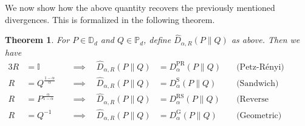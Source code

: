 \documentclass[12pt]{article}
\newtheorem{theorem}{Theorem}[section] %
\theoremstyle{definition}
\begin{document}
We now show how the above quantity recovers the previously mentioned divergences. This is formalized in the following theorem.
\begin{theorembox}
 \begin{theorem}
    For $P \in \mathbb D_d$ and $Q \in \mathbb P_d$, define $\hat{D}_{\alpha, R}(P \| Q)$ as above. Then we have
    \begin{alignat}{3}
    R &= \mathbb I  \quad & \implies \quad \hat{D}_{\alpha, R}(P \| Q) &= D_\alpha^\mathrm{PR}(P \| Q)  \quad &\text{(Petz-R\'enyi)}  \\
    R &= Q^\frac{1-\alpha}\alpha \quad  & \implies \quad \hat{D}_{\alpha, R}(P \| Q) &= D_\alpha^\mathrm{S}(P \| Q) \quad &\text{(Sandwich)} \\
    R &= P^\frac\alpha{1-\alpha} \quad  & \implies \quad \hat{D}_{\alpha, R}(P \| Q) &= D_\alpha^\mathrm{RS}(P \| Q)  \quad &\text{(Reverse sandwich)} \\
    R &= Q^{-1}  \quad  & \implies \quad \hat{D}_{\alpha, R}(P \| Q) &= D_\alpha^\mathrm{G}(P \| Q) \quad &\text{(Geometric)}
\end{alignat}
\end{theorem}
\end{theorembox}
\end{document}
